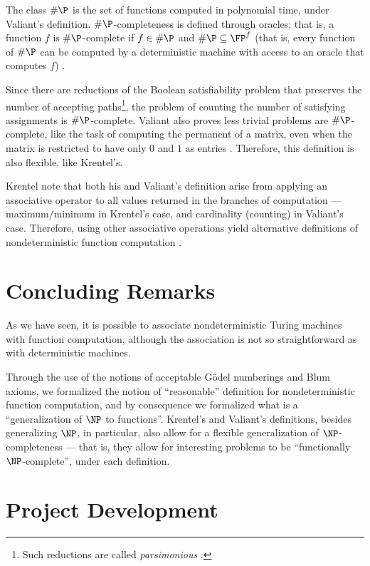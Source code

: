 \documentclass[12pt]{article}
\theoremstyle{definition}
\begin{document}
The class $\#\P$ is the set of functions computed in polynomial time,
under Valiant's definition.
$\#\P$-completeness is defined through oracles;
that is, a function $f$ is $\#\P$-complete if $f \in \#\P$
and $\#\P \subseteq \FP^f$
(that is, every function of $\#\P$ can be computed by a deterministic machine
with access to an oracle that computes $f$)
\cite[p.~191]{Valiant1979}.

Since there are reductions of the Boolean satisfiability problem
that preserves the number of accepting paths\footnote{
    Such reductions are called \emph{parsimonious} \cite[p~346]{AroraBarak2009}.
},
the problem of counting the number of satisfying assignments is $\#\P$-complete.
Valiant also proves less trivial problems are $\#\P$-complete,
like the task of computing the permanent of a matrix,
even when the matrix is restricted to have only $0$ and $1$ as entries
\cite[p.~194]{Valiant1979}.
Therefore,
this definition is also flexible, like Krentel's.

Krentel note that both his and Valiant's definition
arise from applying an associative operator
to all values returned in the branches of computation
--- maximum/minimum in Krentel's case,
and cardinality (counting) in Valiant's case.
Therefore, using other associative operations yield alternative definitions
of nondeterministic function computation \cite[p.~493]{Krentel1988}.

\section{Concluding Remarks}
\label{sec:conclusion}

As we have seen,
it is possible to associate nondeterministic Turing machines
with function computation,
although the association is not so straightforward as with deterministic machines.

Through the use of the notions of acceptable Gödel numberings
and Blum axioms,
we formalized the notion of ``reasonable'' definition
for nondeterministic function computation,
and by consequence we formalized what is a ``generalization of $\NP$ to functions''.
Krentel's and Valiant's definitions,
besides generalizing $\NP$, in particular,
also allow for a flexible generalization of $\NP$-completeness
--- that is, they allow for interesting problems to be ``functionally $\NP$-complete'',
under each definition.

\section{Project Development}
\label{sec:development}
\end{document}
